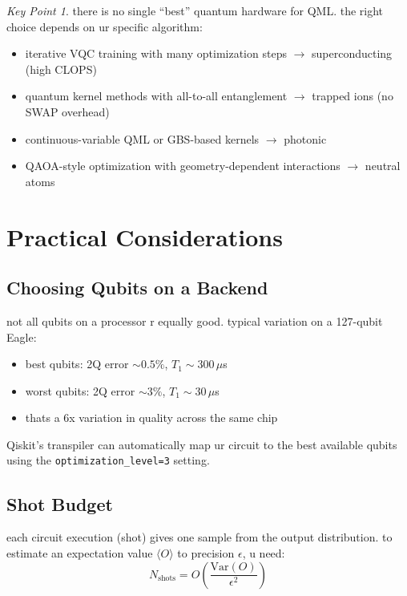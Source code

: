 \documentclass[11pt,a4paper]{article}
\theoremstyle{definition}
\theoremstyle{remark}
\newtheorem*{keypoint}{Key Point}
\begin{document}
\begin{keypoint}
there is no single ``best'' quantum hardware for QML. the right choice depends on ur specific algorithm:
\begin{itemize}[leftmargin=*]
    \item iterative VQC training with many optimization steps $\to$ superconducting (high CLOPS)
    \item quantum kernel methods with all-to-all entanglement $\to$ trapped ions (no SWAP overhead)
    \item continuous-variable QML or GBS-based kernels $\to$ photonic
    \item QAOA-style optimization with geometry-dependent interactions $\to$ neutral atoms
\end{itemize}
\end{keypoint}

\section{Practical Considerations}

\subsection{Choosing Qubits on a Backend}

not all qubits on a processor r equally good. typical variation on a 127-qubit Eagle:
\begin{itemize}[leftmargin=*]
    \item best qubits: 2Q error $\sim 0.5\%$, $T_1 \sim 300 \, \mu$s
    \item worst qubits: 2Q error $\sim 3\%$, $T_1 \sim 30 \, \mu$s
    \item thats a 6x variation in quality across the same chip
\end{itemize}

Qiskit's transpiler can automatically map ur circuit to the best available qubits using the \texttt{optimization\_level=3} setting.

\subsection{Shot Budget}

each circuit execution (shot) gives one sample from the output distribution. to estimate an expectation value $\langle O \rangle$ to precision $\epsilon$, u need:
\[
N_{\text{shots}} = O\left(\frac{\text{Var}(O)}{\epsilon^2}\right)
\]
\end{document}
